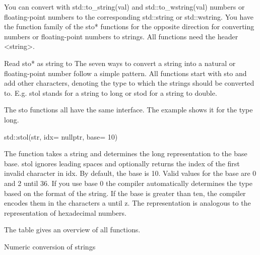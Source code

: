 

You can convert with std::to\_string(val) and std::to\_wstring(val) numbers or floating-point numbers to the corresponding std::string or std::wstring. You have the function family of the sto* functions for the opposite direction for converting numbers or floating-point numbers to strings. All functions need the header <string>.

\begin{myTip}{Read sto* as string to}
The seven ways to convert a string into a natural or floating-point number follow a simple pattern. All functions start with sto and add other characters, denoting the type to which the strings should be converted to. E.g. stol stands for a string to long or stod for a string to double.
\end{myTip}

The sto functions all have the same interface. The example shows it for the type long.

\begin{cpp}
std::stol(str, idx= nullptr, base= 10)
\end{cpp}

The function takes a string and determines the long representation to the base base. stol ignores leading spaces and optionally returns the index of the first invalid character in idx. By default, the base is 10. Valid values for the base are 0 and 2 until 36. If you use base 0 the compiler automatically determines the type based on the format of the string. If the base is greater than ten, the compiler encodes them in the characters a until z. The representation is analogous to the representation of hexadecimal numbers.

The table gives an overview of all functions.

\begin{center}
Numeric conversion of strings
\end{center}

